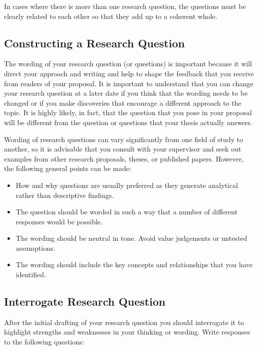 \documentclass[12pt, a4paper]{article}
\begin{document}
In cases where there is more than one research question, the questions must be clearly related to each other so that they add up to a coherent whole.

\subsection{Constructing a Research Question}
The wording of your research question (or questions) is important because it will direct your approach and writing and help to shape the feedback that you receive from readers of your proposal. It is important to understand that you can change your research question at a later date if you think that the wording needs to be changed or if you make discoveries that encourage a different approach to the topic. It is highly likely, in fact, that the question that you pose in your proposal will be different from the question or questions that your thesis actually answers.

Wording of research questions can vary significantly from one field of study to another, so it is advisable that you consult with your supervisor and seek out examples from other research proposals, theses, or published papers. However, the following general points can be made:

\begin{itemize}
\item How and why questions are usually preferred as they generate analytical rather than descriptive findings.
\item The question should be worded in such a way that a number of different responses would be possible.
\item The wording should be neutral in tone. Avoid value judgements or untested assumptions.
\item The wording should include the key concepts and relationships that you have identified.
\end{itemize}

\subsection{Interrogate Research Question}
After the initial drafting of your research question you should interrogate it to highlight strengths and weaknesses in your thinking or wording. Write responses to the following questions: 
\end{document}
